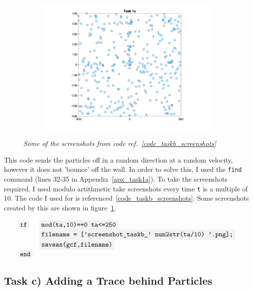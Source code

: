 \documentclass[10pt,a4paper]{article}
\newcommand{\code}[1]{\colorbox{light-gray}{\texttt{#1}}}
\begin{document}
\begin{figure}[h!]
\begin{center}
\begin{subfigure}{0.25\textwidth}
				\includegraphics[width=\textwidth]{screenshot_taskb_25.png}
			\end{subfigure}
		\end{center}
		\caption{\label{fig_taskb_screenshots}\textit{Some of the screenshots from code ref.~\ref{code_taskb_screenshots}}}
	\end{figure}
	
	This code sends the particles off in a random direction at a random velocity, however it does not 'bounce' off the wall. In order to solve this, I used the \code{find} command (lines 32-35 in Appendix~\ref{apx_task1a}).	To take the screenshots required, I used modulo artithmetic take screenshots every time \code{t} is a multiple of 10. The code I used for is referenced~\ref{code_taskb_screenshots}. Some screenshots created by this are shown in figure~\ref{fig_taskb_screenshots}.
	
	\begin{equation} %
	\label{code_taskb_screenshots} 
	\begin{array}{ll}
	\code{if} & \code{mod(ta,10)==0  ta<=250}\\
	&\code{filename = ['screenshot\textunderscore taskb\textunderscore ' num2str(ta/10) '.png];}\\
	&\code{saveas(gcf,filename)}\\
	\code{end}&
	\end{array}
	\end{equation}

	\subsection{Task c) Adding a Trace behind Particles} 
\end{document}
